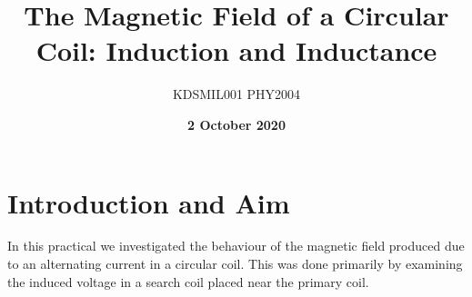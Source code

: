 \documentclass[12pt]{article}
\title{The Magnetic Field of a Circular Coil: Induction and Inductance}
\author{KDSMIL001 \; PHY2004}
\date{\textbf{2 October 2020}}
\numberwithin{equation}{section}
\numberwithin{figure}{section}
\numberwithin{table}{section}
\begin{document}
    \begin{titlepage}
        \maketitle
        \center
        \tableofcontents
    \end{titlepage}
    
    \section{Introduction and Aim}
    In this practical we investigated the behaviour of the magnetic field produced due 
    to an alternating current in a circular coil. This was done primarily by examining 
    the induced voltage in a search coil placed near the primary coil. 
\end{document}
